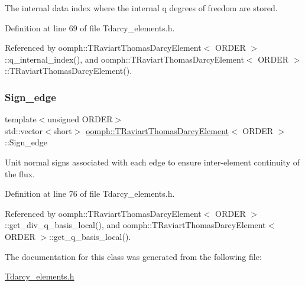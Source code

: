 The internal data index where the internal q degrees of freedom are stored. 



Definition at line 69 of file Tdarcy\+\_\+elements.\+h.



Referenced by oomph\+::\+T\+Raviart\+Thomas\+Darcy\+Element$<$ O\+R\+D\+E\+R $>$\+::q\+\_\+internal\+\_\+index(), and oomph\+::\+T\+Raviart\+Thomas\+Darcy\+Element$<$ O\+R\+D\+E\+R $>$\+::\+T\+Raviart\+Thomas\+Darcy\+Element().

\mbox{\label{classoomph_1_1TRaviartThomasDarcyElement_a8e3b4b2a4d840e22669bc3390843574a}} 
\subsubsection{\texorpdfstring{Sign\+\_\+edge}{Sign\_edge}}
{\footnotesize\ttfamily template$<$unsigned O\+R\+D\+ER$>$ \\
std\+::vector$<$short$>$ \hyperlink{classoomph_1_1TRaviartThomasDarcyElement}{oomph\+::\+T\+Raviart\+Thomas\+Darcy\+Element}$<$ O\+R\+D\+ER $>$\+::Sign\+\_\+edge\hspace{0.3cm}{\ttfamily [private]}}



Unit normal signs associated with each edge to ensure inter-\/element continuity of the flux. 



Definition at line 76 of file Tdarcy\+\_\+elements.\+h.



Referenced by oomph\+::\+T\+Raviart\+Thomas\+Darcy\+Element$<$ O\+R\+D\+E\+R $>$\+::get\+\_\+div\+\_\+q\+\_\+basis\+\_\+local(), and oomph\+::\+T\+Raviart\+Thomas\+Darcy\+Element$<$ O\+R\+D\+E\+R $>$\+::get\+\_\+q\+\_\+basis\+\_\+local().



The documentation for this class was generated from the following file\+:\begin{DoxyCompactItemize}
\item 
\hyperlink{Tdarcy__elements_8h}{Tdarcy\+\_\+elements.\+h}\end{DoxyCompactItemize}
